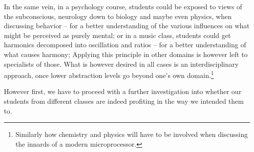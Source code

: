 In the same vein, in a psychology course, students could be exposed to views of the subconscious, neurology down to biology and maybe even physics, when discussing behavior -- for a better understanding of the various influences on what might be perceived as purely mental; or in a music class, students could get harmonics decomposed into oscillation and ratios -- for a better understanding of what causes harmony; \etc Applying this principle in other domains is however left to specialists of those. What is however desired in all cases is an interdisciplinary approach, once lower abstraction levels go beyond one's own domain.\footnote{Similarly how chemistry and physics will have to be involved when discussing the innards of a modern microprocessor.}

However first, we have to proceed with a further investigation into whether our students from different classes are indeed profiting in the way we intended them to.
